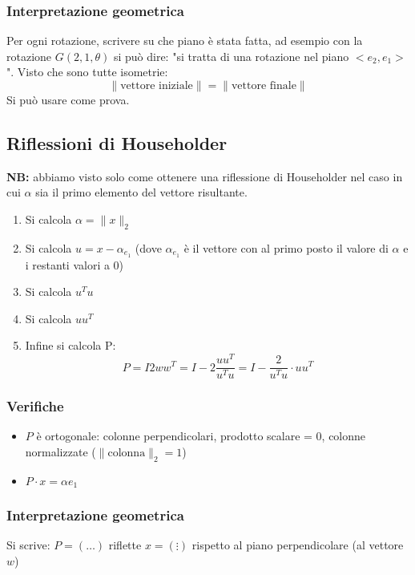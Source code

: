 \documentclass[10pt]{article}
\begin{document}
\subsubsection{Interpretazione geometrica}
Per ogni rotazione, scrivere su che piano è stata fatta, ad esempio con la rotazione $G(2,1,\theta)$ si può dire: "si tratta di una rotazione nel piano $<e_{2},e_{1}>$". Visto che sono tutte isometrie: \begin{equation*}
    \lVert \text{vettore iniziale} \rVert = \lVert \text{vettore finale} \rVert
\end{equation*}
Si può usare come prova.
\subsection{Riflessioni di Householder}
\textbf{NB:} abbiamo visto solo come ottenere una riflessione di Householder nel caso in cui $\alpha$ sia il primo elemento del vettore risultante.
\begin{enumerate}
    \item Si calcola $\alpha=\lVert x\rVert_{2}$
    \item Si calcola $u=x-\alpha_{e_{1}}$ (dove $\alpha_{e_{1}}$ è il vettore con al primo posto il valore di $\alpha$ e i restanti valori a 0)
    \item Si calcola $u^{T}u$
    \item Si calcola $uu^{T}$
    \item Infine si calcola P: \begin{equation*}
        P = I2ww^{T}=I-2\frac{uu^{T}}{u^{T}u}=I-\frac{2}{u^{T}u}\cdot uu^{T}
    \end{equation*}
\end{enumerate}
\subsubsection{Verifiche}
\begin{itemize}
    \item $P$ è ortogonale: colonne perpendicolari, prodotto scalare = 0, colonne normalizzate ($\lVert\text{colonna}\rVert_{2}=1$)
    \item $P\cdot x = \alpha e_{1}$
\end{itemize}
\subsubsection{Interpretazione geometrica}
Si scrive: $P=(\ldots)$ riflette $x=\left(\vdots\right)$ rispetto al piano perpendicolare (al vettore $w$)
\end{document}
